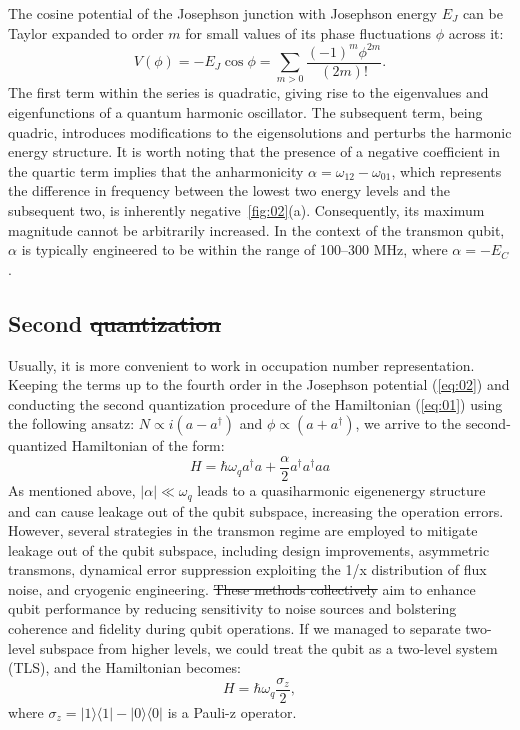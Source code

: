 \documentclass[lettersize,journal]{IEEEtran}
\providecommand{\DIFaddtex}[1]{{\protect\color{blue}\uwave{#1}}} %
\providecommand{\DIFdeltex}[1]{{\protect\color{red}\sout{#1}}}                      %
\providecommand{\DIFaddbegin}{} %
\providecommand{\DIFaddend}{} %
\providecommand{\DIFdelbegin}{} %
\providecommand{\DIFdelend}{} %
\providecommand{\DIFadd}[1]{\texorpdfstring{\DIFaddtex{#1}}{#1}} %
\providecommand{\DIFdel}[1]{\texorpdfstring{\DIFdeltex{#1}}{}} %
\newcommand{\DIFscaledelfig}{0.5}
\newlength{\DIFdelgraphicswidth} %
\newlength{\DIFdelgraphicsheight} %
\newcommand{\DIFaddincludegraphics}[2][]{{\color{blue}\fbox{\DIFOincludegraphics[#1]{#2}}}} %
\newcommand{\DIFdelincludegraphics}[2][]{%
\sbox{\DIFdelgraphicsbox}{\DIFOincludegraphics[#1]{#2}}%
\settoboxwidth{\DIFdelgraphicswidth}{\DIFdelgraphicsbox} %
\settoboxtotalheight{\DIFdelgraphicsheight}{\DIFdelgraphicsbox} %
\scalebox{\DIFscaledelfig}{%
\parbox[b]{\DIFdelgraphicswidth}{\usebox{\DIFdelgraphicsbox}\\[-\baselineskip] \rule{\DIFdelgraphicswidth}{0em}}\llap{\resizebox{\DIFdelgraphicswidth}{\DIFdelgraphicsheight}{%
\setlength{\unitlength}{\DIFdelgraphicswidth}%
\begin{picture}(1,1)%
\thicklines\linethickness{2pt} %
{\color[rgb]{1,0,0}\put(0,0){\framebox(1,1){}}}%
{\color[rgb]{1,0,0}\put(0,0){\line( 1,1){1}}}%
{\color[rgb]{1,0,0}\put(0,1){\line(1,-1){1}}}%
\end{picture}%
}\hspace*{3pt}}} %
} %
\DeclareRobustCommand{\DIFaddbegin}{\DIFOaddbegin \let\includegraphics\DIFaddincludegraphics} %
\DeclareRobustCommand{\DIFaddend}{\DIFOaddend \let\includegraphics\DIFOincludegraphics} %
\DeclareRobustCommand{\DIFdelbegin}{\DIFOdelbegin \let\includegraphics\DIFdelincludegraphics} %
\DeclareRobustCommand{\DIFdelend}{\DIFOaddend \let\includegraphics\DIFOincludegraphics} %
\begin{document}
The cosine potential of the Josephson junction with Josephson energy $E_J$ can be Taylor expanded to order $m$ for small values of its phase fluctuations $\phi$ across it:
\begin{equation} \label{eq:02}
   V(\phi) = - E_J \cos \phi = \sum_{m > 0} \frac{(-1)^{m} \phi^{2m}}{(2m)!}.
\end{equation}
The first term within the series is quadratic, giving rise to the eigenvalues and eigenfunctions of a quantum harmonic oscillator.
The subsequent term, being quadric, introduces modifications to the eigensolutions and perturbs the harmonic energy structure.
It is worth noting that the presence of a negative coefficient in the quartic term implies that the anharmonicity $\alpha = \omega_{12} - \omega_{01}$, which represents the difference in frequency between the lowest two energy levels and the subsequent two, is inherently negative~\ref{fig:02}(a). 
Consequently, its maximum magnitude cannot be arbitrarily increased. 
In the context of the transmon qubit, $\alpha$ is typically engineered to be within the range of 100–300 MHz, where $\alpha = -E_C$.

\subsection{Second \DIFdelbegin \DIFdel{quantization}\DIFdelend \DIFaddbegin \DIFadd{Quantization}\DIFaddend }

Usually, it is more convenient to work in occupation number representation.
Keeping the terms up to the fourth order in the Josephson potential (\ref{eq:02}) and conducting the second quantization procedure of the Hamiltonian (\ref{eq:01}) using the following ansatz: $N \propto i(a - a^\dag)$ and $\phi \propto (a + a^\dag)$, we arrive to the second-quantized Hamiltonian of the form:
\begin{equation} \label{eq:03}
    H = \hbar \omega_q a^\dag a + \frac{\alpha}{2} a^\dag a^\dag a a
\end{equation}
As mentioned above, $|\alpha| \ll \omega_q$ leads to a quasiharmonic eigenenergy structure and can cause leakage out of the qubit subspace, increasing the operation errors.
However, several strategies in the transmon regime are employed to mitigate leakage out of the qubit subspace, including design improvements, asymmetric transmons, dynamical error suppression exploiting the 1/x distribution of flux noise, and cryogenic engineering. 
\DIFdelbegin \DIFdel{These methods collectively }\DIFdelend \DIFaddbegin \DIFadd{Collectively, these methods }\DIFaddend aim to enhance qubit performance by reducing sensitivity to noise sources and bolstering coherence and fidelity during qubit operations.
If we managed to separate two-level subspace from higher levels, we could treat the qubit as a two-level system (TLS), and the Hamiltonian becomes:
\begin{equation} \label{eq:03_1}
    H = \hbar \omega_q \frac{\sigma_z}{2},
\end{equation}
where $\sigma_z = |1\rangle\langle 1 | - | 0 \rangle \langle 0|$ is a Pauli-z operator.
\end{document}
